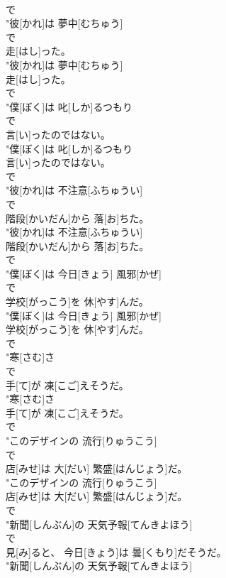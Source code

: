 \documentclass[8pt]{extreport}
\begin{document}
\begin{CJK}{UTF8}{min}
\\	で
\\	"彼[かれ]は 夢中[むちゅう]
\\	で
\\	走[はし]った。
\\	"彼[かれ]は 夢中[むちゅう]
\\	走[はし]った。
\\	で
\\	"僕[ぼく]は 叱[しか]るつもり
\\	で
\\	言[い]ったのではない。
\\	"僕[ぼく]は 叱[しか]るつもり
\\	言[い]ったのではない。
\\	で
\\	"彼[かれ]は 不注意[ふちゅうい]
\\	で
\\	階段[かいだん]から 落[お]ちた。
\\	"彼[かれ]は 不注意[ふちゅうい]
\\	階段[かいだん]から 落[お]ちた。
\\	で
\\	"僕[ぼく]は 今日[きょう] 風邪[かぜ]
\\	で
\\	学校[がっこう]を 休[やす]んだ。
\\	"僕[ぼく]は 今日[きょう] 風邪[かぜ]
\\	学校[がっこう]を 休[やす]んだ。
\\	で
\\	"寒[さむ]さ
\\	で
\\	手[て]が 凍[こご]えそうだ。
\\	"寒[さむ]さ
\\	手[て]が 凍[こご]えそうだ。
\\	で
\\	"このデザインの 流行[りゅうこう]
\\	で
\\	店[みせ]は 大[だい] 繁盛[はんじょう]だ。
\\	"このデザインの 流行[りゅうこう]
\\	店[みせ]は 大[だい] 繁盛[はんじょう]だ。
\\	で
\\	"新聞[しんぶん]の 天気予報[てんきよほう]
\\	で
\\	見[み]ると、 今日[きょう]は 曇[くもり]だそうだ。
\\	"新聞[しんぶん]の 天気予報[てんきよほう]

\end{CJK}
\end{document}

